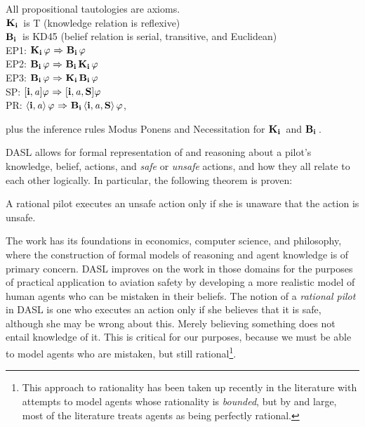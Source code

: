\begin{tcolorbox}{\normalsize}
	All propositional tautologies are axioms.\\
		$\mathbf{K}_{\mathbf{i}}\,$ is T (knowledge relation is reflexive)\\
	$\mathbf{B}_{\mathbf{i}}\,$ is KD45 (belief relation is serial, transitive, and Euclidean)\\
	EP1: $\mathbf{K}_{\mathbf{i}}\,\varphi {\ \Rightarrow \ } \mathbf{B}_{\mathbf{i}}\,\varphi$ \\
	EP2: $\mathbf{B}_{\mathbf{i}}\,\varphi {\ \Rightarrow \ } \mathbf{B}_{\mathbf{i}}\,\mathbf{K}_{\mathbf{i}}\,\varphi$\\
	EP3: $\mathbf{B}_{\mathbf{i}}\,\varphi {\ \Rightarrow \ } \mathbf{K}_{\mathbf{i}}\,\mathbf{B}_{\mathbf{i}}\,\varphi$\\
	SP: $\mathbf{[{i,\mathit{a}}]}\varphi {\ \Rightarrow \ } \mathbf{[{i,\mathit{a},S}]}\varphi$\\
	PR: $\mathbf{\langle i, \mathit{a} \rangle}\,\varphi {\ \Rightarrow \ } \mathbf{B}_{\mathbf{i}}\,\mathbf{\langle i, \mathit{a},\mathbf{S} \rangle}\,\varphi$,\\
\end{tcolorbox}
\noindent plus the inference rules Modus Ponens and Necessitation for $\mathbf{K}_{\mathbf{i}}\,$ and $\mathbf{B}_{\mathbf{i}}\,$.

DASL allows for formal representation of and reasoning about a pilot's knowledge, belief, actions, and \emph{safe} or \emph{unsafe} actions, and how they all relate to each other logically. In particular, the following theorem is proven:
\begin{theorem}
	\label{unawareness}
	A rational pilot executes an unsafe action only if she is unaware that the action is unsafe.
\end{theorem}

The work has its foundations in economics, computer science, and philosophy, where the construction of formal models of reasoning and agent knowledge is of primary concern. DASL improves on the work in those domains for the purposes of practical application to aviation safety by developing a more realistic model of human agents who can be mistaken in their beliefs. The notion of a \emph{rational pilot} in DASL is one who executes an action only if she believes that it is safe, although she may be wrong about this. Merely believing something does not entail knowledge of it. This is critical for our purposes, because we must be able to model agents who are mistaken, but still rational\footnote{This approach to rationality has been taken up recently in the literature with attempts to model agents whose rationality is \emph{bounded}, but by and large, most of the literature treats agents as being perfectly rational.}. 

